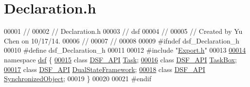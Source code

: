 \hypertarget{_declaration_8h_source}{}\section{Declaration.\+h}
\label{_declaration_8h_source}

\begin{DoxyCode}
00001 \textcolor{comment}{//}
00002 \textcolor{comment}{//  Declaration.h}
00003 \textcolor{comment}{//  dsf}
00004 \textcolor{comment}{//}
00005 \textcolor{comment}{//  Created by Yu Chen on 10/17/14.}
00006 \textcolor{comment}{//}
00007 \textcolor{comment}{//}
00008 
00009 \textcolor{preprocessor}{#ifndef dsf\_Declaration\_h}
00010 \textcolor{preprocessor}{#define dsf\_Declaration\_h}
00011 
00012 \textcolor{preprocessor}{#include "\hyperlink{dsf_2_export_8h}{Export.h}"}
00013 
\hypertarget{_declaration_8h_source_l00014}{}\hyperlink{namespacedsf}{00014} \textcolor{keyword}{namespace }\hyperlink{namespacedsf}{dsf} \{
\hypertarget{_declaration_8h_source_l00015}{}\hyperlink{namespacedsf_a7df24c7d3d82e2e686aa3a524dc1dee9}{00015}     \textcolor{keyword}{class }\hyperlink{dsf_2_export_8h_ad7bb940831423512f29a6981786c37bd}{DSF\_API} \hyperlink{classdsf_1_1_task}{Task};
\hypertarget{_declaration_8h_source_l00016}{}\hyperlink{namespacedsf_ac3c92e2a98380dd728b0c18d0c495966}{00016}     \textcolor{keyword}{class }\hyperlink{dsf_2_export_8h_ad7bb940831423512f29a6981786c37bd}{DSF\_API} \hyperlink{classdsf_1_1_task_box}{TaskBox};
\hypertarget{_declaration_8h_source_l00017}{}\hyperlink{namespacedsf_a68ac3b6a0526bfa7f6a412918afb1841}{00017}     \textcolor{keyword}{class }\hyperlink{dsf_2_export_8h_ad7bb940831423512f29a6981786c37bd}{DSF\_API} \hyperlink{classdsf_1_1_dual_state_framework}{DualStateFramework};
\hypertarget{_declaration_8h_source_l00018}{}\hyperlink{namespacedsf_acbf1798fc56cfb1707162a17e13f5fda}{00018}     \textcolor{keyword}{class }\hyperlink{dsf_2_export_8h_ad7bb940831423512f29a6981786c37bd}{DSF\_API} \hyperlink{classdsf_1_1_synchronized_object}{SynchronizedObject};
00019 \}
00020 
00021 \textcolor{preprocessor}{#endif}
\end{DoxyCode}
